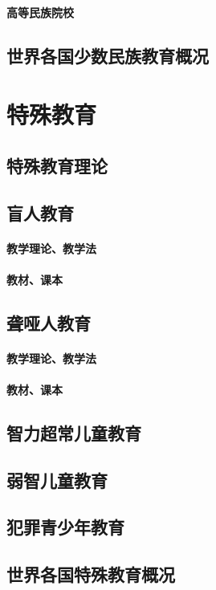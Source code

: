 \documentclass[UTF8]{../../ApplicationUniverse}
\begin{document}
        \subsubsection{高等民族院校}
    \section{世界各国少数民族教育概况}






\chapter{特殊教育}
\section{特殊教育理论}
\section{盲人教育}
    \subsubsection{教学理论、教学法}
    \subsubsection{教材、课本}
\section{聋哑人教育}
    \subsubsection{教学理论、教学法}
    \subsubsection{教材、课本}
\section{智力超常儿童教育}
\section{弱智儿童教育}
\section{犯罪青少年教育}
\section{世界各国特殊教育概况}
\end{document}
